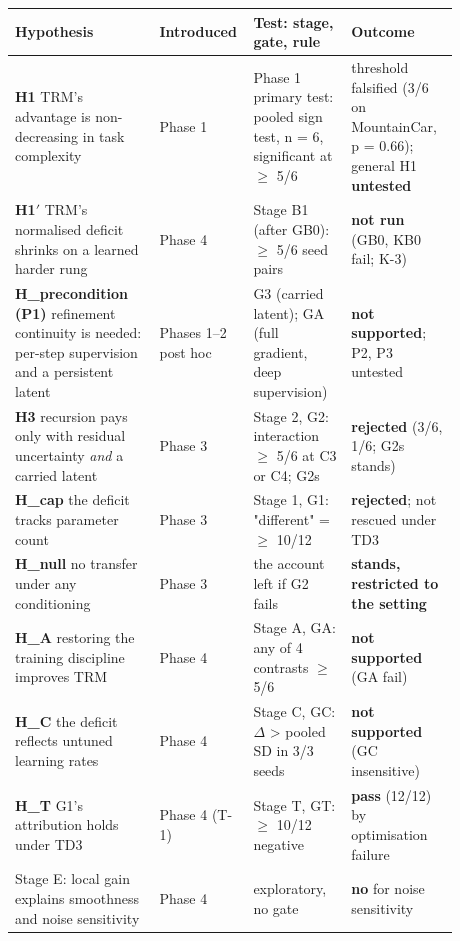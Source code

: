 \documentclass[11pt]{article}
\begin{document}
\begin{center}\small\begin{tabular}{>{\raggedright\arraybackslash}p{0.312\linewidth}>{\raggedright\arraybackslash}p{0.115\linewidth}>{\raggedright\arraybackslash}p{0.219\linewidth}>{\raggedright\arraybackslash}p{0.231\linewidth}}
\toprule
Hypothesis & Introduced & Test: stage, gate, rule & Outcome \\
\midrule
\textbf{H1} TRM's advantage is non-decreasing in task complexity & Phase 1 & Phase 1 primary test: pooled sign test, n = 6, significant at $\geq$ 5/6 & threshold falsified (3/6 on MountainCar, p = 0.66); general H1 \textbf{untested} \\
\textbf{H1$'$} TRM's normalised deficit shrinks on a learned harder rung & Phase 4 & Stage B1 (after GB0): $\geq$ 5/6 seed pairs & \textbf{not run} (GB0, KB0 fail; K-3) \\
\textbf{H\_precondition (P1)} refinement continuity is needed: per-step supervision and a persistent latent & Phases 1--2 post hoc & G3 (carried latent); GA (full gradient, deep supervision) & \textbf{not supported}; P2, P3 untested \\
\textbf{H3} recursion pays only with residual uncertainty \emph{and} a carried latent & Phase 3 & Stage 2, G2: interaction $\geq$ 5/6 at C3 or C4; G2s & \textbf{rejected} (3/6, 1/6; G2s stands) \\
\textbf{H\_cap} the deficit tracks parameter count & Phase 3 & Stage 1, G1: "different" = $\geq$ 10/12 & \textbf{rejected}; not rescued under TD3 \\
\textbf{H\_null} no transfer under any conditioning & Phase 3 & the account left if G2 fails & \textbf{stands, restricted to the setting} \\
\textbf{H\_A} restoring the training discipline improves TRM & Phase 4 & Stage A, GA: any of 4 contrasts $\geq$ 5/6 & \textbf{not supported} (GA fail) \\
\textbf{H\_C} the deficit reflects untuned learning rates & Phase 4 & Stage C, GC: $\Delta$ > pooled SD in 3/3 seeds & \textbf{not supported} (GC insensitive) \\
\textbf{H\_T} G1's attribution holds under TD3 & Phase 4 (T-1) & Stage T, GT: $\geq$ 10/12 negative & \textbf{pass} (12/12) by optimisation failure \\
Stage E: local gain explains smoothness and noise sensitivity & Phase 4 & exploratory, no gate & \textbf{no} for noise sensitivity \\
\bottomrule
\end{tabular}\end{center}
\end{document}
